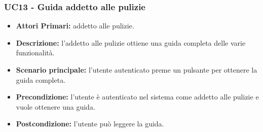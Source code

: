 \subsubsection{ UC13 - Guida addetto alle pulizie}
\begin{itemize}
	\item\textbf{Attori Primari:} 
	addetto alle pulizie.
	\item\textbf{Descrizione:} 
	l'addetto alle pulizie ottiene una guida completa delle varie funzionalità.
	\item\textbf{Scenario principale:} 
	l'utente autenticato preme un pulsante per ottenere la guida completa.
	\item\textbf{Precondizione:} 
	l'utente è autenticato nel sistema come addetto alle pulizie e vuole ottenere una guida.
	\item\textbf{Postcondizione:}
	l'utente può leggere la guida.
\end{itemize}


